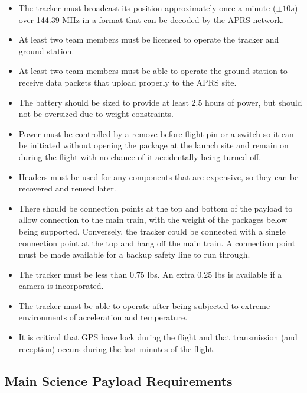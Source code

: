 \documentclass[11pt]{article}
\begin{document}
\begin{itemize}
  \item The tracker must broadcast its position approximately once a
    minute ($\pm 10s$) over 144.39 MHz in a format that can be decoded by
    the APRS network.
  \item At least two team members must be licensed to operate the
    tracker and ground station.
  \item At least two team members must be able to operate the ground
    station to receive data packets that upload properly to the APRS
    site.
  \item The battery should be sized to provide at least 2.5 hours of
    power, but should not be oversized due to weight constraints.
  \item Power must be controlled by a remove before flight pin or a
    switch so it can be initiated without opening the package at the
    launch site and remain on during the flight with no chance of it
    accidentally being turned off.
  \item Headers must be used for any components that are expensive, so
    they can be recovered and reused later.
  \item There should be connection points at the top and bottom of the
    payload to allow connection to the main train, with the weight of
    the packages below being supported. Conversely, the tracker could
    be connected with a single connection point at the top and hang
    off the main train. A connection point must be made available for
    a backup safety line to run through.
  \item The tracker must be less than 0.75 lbs. An extra 0.25 lbs is
    available if a camera is incorporated.
  \item The tracker must be able to operate after being subjected to
    extreme environments of acceleration and temperature.
  \item It is critical that GPS have lock during the flight and that
    transmission (and reception) occurs during the last minutes of the
    flight.
\end{itemize}

\subsection{Main Science Payload Requirements}
\end{document}
